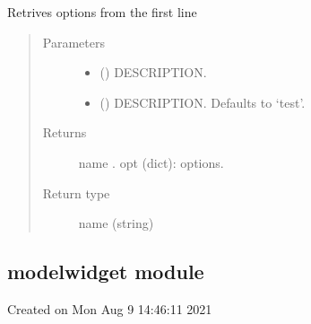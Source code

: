 \documentclass[letterpaper,10pt,english]{sphinxmanual}
\begin{document}
\begin{fulllineitems}
\label{\detokenize{jupyter/modeljupytermagic:modeljupytermagic.get_options}}
\pysigstartsignatures
{}
\pysigstopsignatures
\sphinxAtStartPar
Retrives options from the first line
\begin{quote}\begin{description}
\item[{Parameters}] \leavevmode\begin{itemize}
\item {} 
\sphinxAtStartPar
{} () \textendash{} DESCRIPTION.

\item {} 
\sphinxAtStartPar
{} (\sphinxstyleliteralemphasis{\sphinxupquote{, }}) \textendash{} DESCRIPTION. Defaults to ‘test’.

\end{itemize}

\item[{Returns}] \leavevmode
\sphinxAtStartPar
name .
opt (dict): options.

\item[{Return type}] \leavevmode
\sphinxAtStartPar
name (string)

\end{description}\end{quote}

\end{fulllineitems}


\sphinxstepscope


\subsection{modelwidget module}
\label{\detokenize{jupyter/modelwidget:module-modelwidget}}\label{\detokenize{jupyter/modelwidget:modelwidget-module}}\label{\detokenize{jupyter/modelwidget::doc}}
\sphinxAtStartPar
Created on Mon Aug  9 14:46:11 2021
\end{document}
